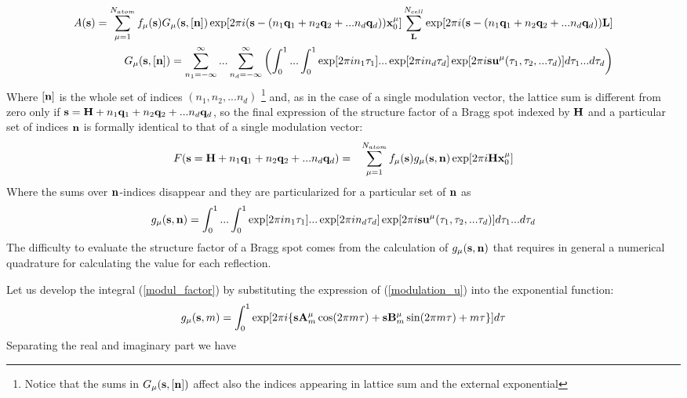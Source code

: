\documentclass[10pt]{article}
\begin{document}
\begin{eqnarray} \label{scat_amplitude_multiq}
A({\bf s})=  \sum_{\mu=1}^{N_{atom}}f_{\mu}({\bf s}) G_\mu({\bf s},[{\bf n}])  \exp[2 \pi i( {\bf s}-(n_1{\bf q}_1+n_2{\bf q}_2+...n_d{\bf q}_d)) {\bf x}_0^{\mu}] \sum_{\bf L}^{N_{cell}} \exp[2 \pi i ({\bf s}-(n_1{\bf q}_1+n_2{\bf q}_2+...n_d{\bf q}_d)){\bf L}] \\
G_\mu({\bf s},[{\bf n}])= \sum_{n_1=-\infty}^{\infty} ...\sum_{n_d=-\infty}^{\infty}  \left (   \int_{0}^{1} ...\int_{0}^{1}  \exp[2 \pi i n_1 \tau_1] ... \exp[2 \pi i n_d \tau_d]  \exp [2 \pi i{\bf s}{\bf u}^{\mu}(\tau_1,\tau_2,...\tau_d)] d\tau_1 ... d\tau_d \right )
\end{eqnarray}
Where $[{\bf n}]$ is the whole set of indices $(n_1,n_2,...n_d)$ \footnote{Notice that the sums in $G_\mu({\bf s},[{\bf n}]) $ affect also the indices appearing in lattice sum and the external exponential} and,
as in the case of a single modulation vector, the lattice sum is different from zero only if ${\bf s} = {\bf H} + n_1{\bf q}_1+n_2{\bf q}_2+...n_d{\bf q}_d$, so the final expression of the structure factor of a Bragg spot indexed by $ {\bf H}$ and a particular set of indices ${\bf n}$ is formally identical to that of a single modulation vector:
\begin{eqnarray} \label{strf_multik}
F({\bf s}={\bf H} + n_1{\bf q}_1+n_2{\bf q}_2+...n_d{\bf q}_d)&=& \sum_{\mu=1}^{N_{atom}} f_{\mu}({\bf s}) g_\mu({\bf s},{\bf n})   \exp[2 \pi i{\bf H} {\bf x}_0^{\mu}]
\end{eqnarray}
Where the sums over ${\bf n}$-indices disappear and they are particularized for a particular set of ${\bf n}$ as
\begin{equation} \label{modul_factor_multi}
g_\mu({\bf s},{\bf n})= \int_{0}^{1} ...\int_{0}^{1}  \exp[2 \pi i n_1 \tau_1] ... \exp[2 \pi i n_d \tau_d]  \exp [2 \pi i{\bf s}{\bf u}^{\mu}(\tau_1,\tau_2,...\tau_d)] d\tau_1 ... d\tau_d   
\end{equation}
The difficulty to evaluate the structure factor of a Bragg spot comes from the calculation of $g_\mu({\bf s},{\bf n})$ that requires in general a numerical quadrature for calculating the value for each reflection.

Let us develop the integral (\ref{modul_factor}) by substituting the expression of (\ref{modulation_u}) into the exponential function:
\begin{equation} \label{modul_factor2}
g_\mu({\bf s},m)= \int_{0}^{1}  \exp [2 \pi i\{{\bf s}{\bf A}_m^{\mu} \cos(2\pi m \tau)+ {\bf s}{\bf B}_m^{\mu} \sin(2\pi m \tau)+m\tau\}] d\tau 
\end{equation}
Separating the real and imaginary part we have
\end{document}
